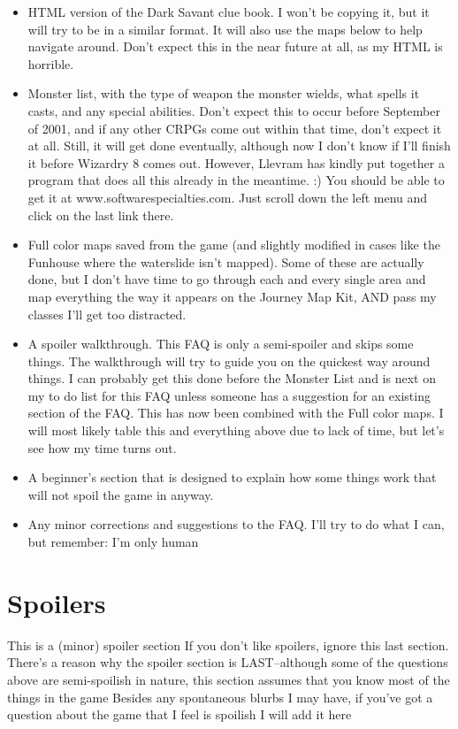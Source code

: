 \documentclass[12pt]{article}
\providecommand{\tightlist}{%
  \setlength{\itemsep}{0pt}\setlength{\parskip}{0pt}}
\begin{document}
\begin{itemize}
\tightlist
\item
  HTML version of the Dark Savant clue book. I won't be copying it, but
  it will try to be in a similar format. It will also use the maps below
  to help navigate around. Don't expect this in the near future at all,
  as my HTML is horrible.
\item
  Monster list, with the type of weapon the monster wields, what spells
  it casts, and any special abilities. Don't expect this to occur before
  September of 2001, and if any other CRPGs come out within that time,
  don't expect it at all. Still, it will get done eventually, although
  now I don't know if I'll finish it before Wizardry 8 comes out.
  However, Llevram has kindly put together a program that does all this
  already in the meantime. :) You should be able to get it at
  www.softwarespecialties.com. Just scroll down the left menu and click
  on the last link there.
\item
  Full color maps saved from the game (and slightly modified in cases
  like the Funhouse where the waterslide isn't mapped). Some of these
  are actually done, but I don't have time to go through each and every
  single area and map everything the way it appears on the Journey Map
  Kit, AND pass my classes I'll get too distracted.
\item
  A spoiler walkthrough. This FAQ is only a semi-spoiler and skips some
  things. The walkthrough will try to guide you on the quickest way
  around things. I can probably get this done before the Monster List
  and is next on my to do list for this FAQ unless someone has a
  suggestion for an existing section of the FAQ. This has now been
  combined with the Full color maps. I will most likely table this and
  everything above due to lack of time, but let's see how my time turns
  out.
\item
  A beginner's section that is designed to explain how some things work
  that will not spoil the game in anyway.
\item
  Any minor corrections and suggestions to the FAQ. I'll try to do what
  I can, but remember: I'm only human
\end{itemize}

\section{Spoilers}\label{spoilers}

This is a (minor) spoiler section If you don't like spoilers, ignore
this last section. There's a reason why the spoiler section is
LAST--although some of the questions above are semi-spoilish in nature,
this section assumes that you know most of the things in the game
Besides any spontaneous blurbs I may have, if you've got a question
about the game that I feel is spoilish I will add it here
\end{document}
